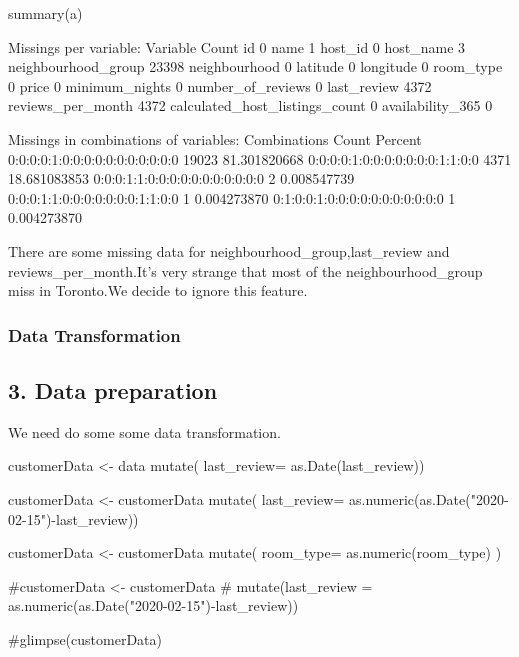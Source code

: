 \begin{Schunk}
\begin{Sinput}
summary(a)
\end{Sinput}
\begin{Soutput}

 Missings per variable: 
                       Variable Count
                             id     0
                           name     1
                        host_id     0
                      host_name     3
            neighbourhood_group 23398
                  neighbourhood     0
                       latitude     0
                      longitude     0
                      room_type     0
                          price     0
                 minimum_nights     0
              number_of_reviews     0
                    last_review  4372
              reviews_per_month  4372
 calculated_host_listings_count     0
               availability_365     0

 Missings in combinations of variables: 
                    Combinations Count      Percent
 0:0:0:0:1:0:0:0:0:0:0:0:0:0:0:0 19023 81.301820668
 0:0:0:0:1:0:0:0:0:0:0:0:1:1:0:0  4371 18.681083853
 0:0:0:1:1:0:0:0:0:0:0:0:0:0:0:0     2  0.008547739
 0:0:0:1:1:0:0:0:0:0:0:0:1:1:0:0     1  0.004273870
 0:1:0:0:1:0:0:0:0:0:0:0:0:0:0:0     1  0.004273870
\end{Soutput}
\end{Schunk}

There are some missing data for neighbourhood\_group,last\_review and
reviews\_per\_month.It's very strange that most of the
neighbourhood\_group miss in Toronto.We decide to ignore this feature.

\hypertarget{data-transformation}{%
\subsubsection{Data Transformation}\label{data-transformation}}

\hypertarget{data-preparation}{%
\subsection{3. Data preparation}\label{data-preparation}}

We need do some some data transformation.

\begin{Schunk}
\begin{Sinput}
customerData <- data %
  mutate( last_review= as.Date(last_review)) 
         
customerData <- customerData %
  mutate( last_review= as.numeric(as.Date("2020-02-15")-last_review)) 

customerData <- customerData %
  mutate( room_type= as.numeric(room_type) )

#customerData <- customerData %
#  mutate(last_review = as.numeric(as.Date("2020-02-15")-last_review))

#glimpse(customerData)
\end{Sinput}
\end{Schunk}

